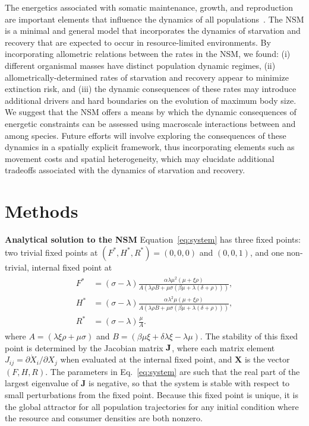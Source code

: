 \documentclass[twocolumn,preprintnumbers,amsmath,amssymb,superscriptaddress]{revtex4}
\begin{document}
\begin{bibunit}[unsrt]
The energetics associated with somatic maintenance, growth, and reproduction are important elements that influence the dynamics of all populations~\citep{Stearns:1989ip}.
The NSM is a minimal and general model that incorporates the dynamics of starvation and recovery that are expected to occur in resource-limited environments.
By incorporating allometric relations between the rates in the NSM, we found: (i) different organismal masses have distinct population dynamic regimes, (ii) allometrically-determined rates of starvation and recovery appear to minimize extinction risk, and (iii) the dynamic consequences of these rates may introduce additional drivers and hard boundaries on the evolution of maximum body size.
We suggest that the NSM offers a means by which the dynamic consequences of energetic constraints can be assessed using macroscale interactions between and among species.
Future efforts will involve exploring the consequences of these dynamics in a spatially explicit framework, thus incorporating elements such as movement costs and spatial heterogeneity, which may elucidate additional tradeoffs associated with the dynamics of starvation and recovery.



\section*{Methods}
\small{
{\bf Analytical solution to the NSM}
Equation~\eqref{eq:system} has three fixed points: two trivial fixed points at $(F^*,H^*,R^*)=(0,0,0)$ and $(0,0,1)$, and one non-trivial, internal fixed point at
\begin{align}
\label{eq:ss}
\begin{split}
F^* &= (\sigma-\lambda)\frac{ \alpha  \lambda  \mu ^2  (\mu +\xi  \rho )}{A (\lambda  \rho  B+\mu  \sigma  (\beta  \mu +\lambda  (\delta +\rho )))}, \\
H^* &= (\sigma-\lambda)\frac{ \alpha  \lambda ^2 \mu  (\mu +\xi  \rho )}{A (\lambda  \rho  B+\mu  \sigma  (\beta  \mu +\lambda  (\delta +\rho )))}, \\
R^* &= (\sigma - \lambda)\frac{\mu  }{A}.
\end{split}
\end{align}
where $A=(\lambda  \xi  \rho +\mu  \sigma )$ and $B=(\beta  \mu  \xi +\delta  \lambda  \xi -\lambda  \mu )$. The stability of this fixed point is determined by the Jacobian matrix $\bf J$, where each matrix element $J_{ij}=\partial{\dot X_i}/\partial{X_j}$ when evaluated at the internal fixed point, and $\mathbf{X}$ is the vector $(F,H,R)$.
The parameters in Eq.~\eqref{eq:system} are such that the real part of the largest eigenvalue of $\mathbf{J}$ is negative, so that the system is stable with respect to small perturbations from the fixed point.
Because this fixed point is unique, it is the global attractor for all population trajectories for any initial condition where the resource and consumer densities are both nonzero.

}
\end{bibunit}
\end{document}
